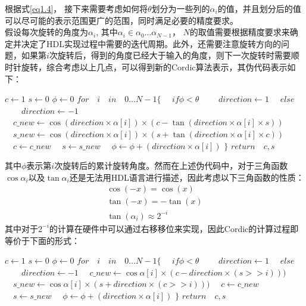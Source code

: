 \documentclass[a4paper,12pt]{report}
\begin{document}
根据式\ref{eq1.4}， 接下来需要考虑如何将$\theta$划分为一些列的$\alpha_i$的值，并且划分后的值可以尽可能的表示范围更广的范围，同时满足必要的精度要求。\\
\indent 假设每次旋转的角度为$\alpha_i$, 其中$\alpha_i \in \alpha_0 \dots \alpha_{N-1}$， $N$的取值需要根据精度要求来确定并决定了HDL实现过程中需要的迭代周期。此外，还需要注意旋转方向的问题，如果第$i$次旋转后，得到的角度已经大于输入的角度，则下一次旋转时需要顺时针旋转，综合考虑以上几点，可以得到新的Cordic算法表示，其伪代码表示如下：
\begin{codebox}
\li $c \leftarrow 1$
\li $s \leftarrow 0$
\li $\phi \leftarrow 0$
\li $for \quad i \quad in \quad 0\dots N-1 \{$
\li $\quad if \phi < \theta$
\li $\quad \quad direction \leftarrow 1$
\li $\quad else $
\li $\quad \quad direction \leftarrow -1$
\li $\quad c\_new \leftarrow \cos(direction \times \alpha[i]) \times (c - \tan(direction \times \alpha[i] \times s))$
\li $\quad s\_new \leftarrow \cos(direction \times \alpha[i]) \times (s + \tan(direction \times \alpha[i] \times c))$
\li $\quad c \leftarrow c\_new$
\li $\quad s \leftarrow s\_new$
\li $\quad \phi \leftarrow \phi + (direction \times \alpha[i])$
\li $\}$
\li $return \quad c, s$
\end{codebox}
其中$\phi$表示第$i$次旋转后的累计旋转角度。然而在上述伪代码中，对于三角函数$\cos\alpha_i$以及$\tan\alpha_i$还是无法用HDL语言进行描述，因此考虑以下三角函数的性质：
\begin{equation}
\begin{gathered}
\cos(-x) = \cos(x)\\
\tan(-x) = -\tan(x)\\
\tan(\alpha_i) \approx 2^{-i}
\end{gathered}
\end{equation}
其中对于$2^{-i}$的计算在硬件中可以通过右移移位来实现，因此Cordic的计算过程即等价于下面的形式：
\begin{codebox}
\li $c \leftarrow 1$
\li $s \leftarrow 0$
\li $\phi \leftarrow 0$
\li $for \quad i \quad in \quad 0\dots N-1 \{$
\li $\quad if \phi < \theta$
\li $\quad \quad direction \leftarrow 1$
\li $\quad else $
\li $\quad \quad direction \leftarrow -1$
\li $\quad c\_new \leftarrow \cos\alpha[i] \times (c - direction \times (s >> i)))$
\li $\quad s\_new \leftarrow \cos\alpha[i] \times (s + direction \times (c >> i)))$
\li $\quad c \leftarrow c\_new$
\li $\quad s \leftarrow s\_new$
\li $\quad \phi \leftarrow \phi + (direction \times \alpha[i])$
\li $\}$
\li $return \quad c, s$
\end{codebox}
\end{document}
